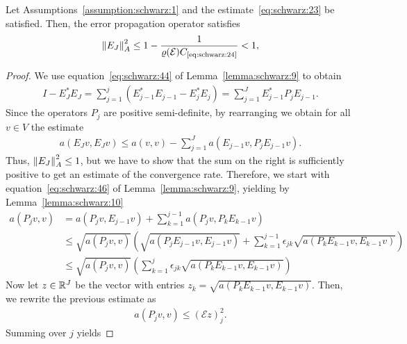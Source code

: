 \begin{theorem}
  Let Assumptions~\ref{assumption:schwarz:1} and the
  estimate~\eqref{eq:schwarz:23} be satisfied. Then, the error
  propagation operator satisfies
  \begin{gather}
    \label{eq:schwarz:47}
    \norm{E_J}_A^2 \le 1 - \frac{1}{\rho(\mathcal E) \constref{eq:schwarz:24}} < 1,
  \end{gather}
\end{theorem}

\begin{proof}
  We use equation~\eqref{eq:schwarz:44} of Lemma~\ref{lemma:schwarz:9} to obtain
  \begin{gather*}
    I- E^*_J E_J = \sum_{j=1}^{j} \left(E^*_{j-1}E_{j-1} -
      E^*_{j}E_{j}\right)
    = \sum_{j=1}^J E^*_{j-1} P_j E_{j-1}.
  \end{gather*}
  Since the operators $P_j$ are positive semi-definite, by rearranging
  we obtain for all $v\in V$ the estimate
  \begin{gather}
    \label{eq:schwarz:49}
    a(E_J v, E_J v) \le a(v,v) - \sum_{j=1}^J a(E_{j-1}v, P_j E_{j-1}v).
  \end{gather}
  Thus, $\left\|E_J\right\|_A^2 \le 1$, but we have to show that the sum on the
  right is sufficiently positive to get an estimate of the convergence
  rate. Therefore, we start with equation~\eqref{eq:schwarz:46} of
  Lemma~\ref{lemma:schwarz:9}, yielding by Lemma~\ref{lemma:schwarz:10}
  \begin{align*}
    a(P_j v,v)
    &= a(P_j v, E_{j-1}v) + \sum_{k=1}^{j-1} a(P_j v, P_k E_{k-1} v)
    \\
    &\le \sqrt{a(P_j v,v)} \left(\sqrt{a(P_j E_{j-1}v,E_{j-1}v)}
    + \sum_{k=1}^{j-1} \epsilon_{jk} \sqrt{a(P_k E_{k-1}v,E_{k-1}v)}
    \right) \\
    & \le \sqrt{a(P_j v,v)} \left(\sum_{k=1}^{j} \epsilon_{jk}
      \sqrt{a(P_k E_{k-1} v,E_{k-1} v)}
    \right)
  \end{align*}
  Now let $z \in \mathbb R^J$ be the vector with entries $z_k = \sqrt{a(P_k
    E_{k-1}v,E_{k-1}v)}$. Then, we rewrite the previous estimate as
  \begin{gather*}
    a(P_j v,v) \le (\mathcal E z)_j^2.
  \end{gather*}
  Summing over $j$ yields
  

\end{proof}
